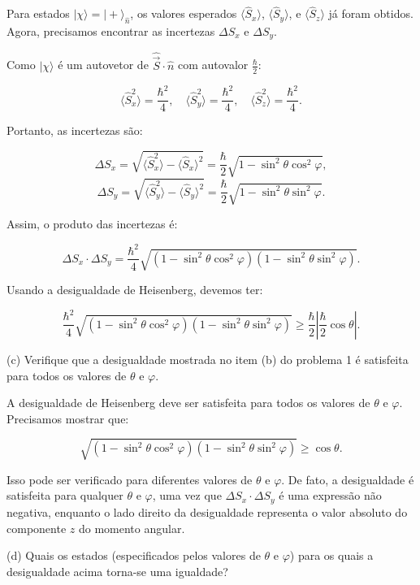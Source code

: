 \documentclass[12pt]{article}
\begin{document}
\begin{enumerate}
Para estados \(|\chi\rangle = |+\rangle_{\hat{n}}\), os valores esperados \(\langle \hat{S}_x \rangle\), \(\langle \hat{S}_y \rangle\), e \(\langle \hat{S}_z \rangle\) já foram obtidos. Agora, precisamos encontrar as incertezas \( \Delta S_x \) e \( \Delta S_y \).

Como \(|\chi\rangle\) é um autovetor de \(\hat{\vec{S}} \cdot \hat{n}\) com autovalor \(\frac{\hbar}{2}\):

\[
\langle \hat{S}_x^2 \rangle = \frac{\hbar^2}{4}, \quad \langle \hat{S}_y^2 \rangle = \frac{\hbar^2}{4}, \quad \langle \hat{S}_z^2 \rangle = \frac{\hbar^2}{4}.
\]

Portanto, as incertezas são:

\[
\Delta S_x = \sqrt{\langle \hat{S}_x^2 \rangle - \langle \hat{S}_x \rangle^2} = \frac{\hbar}{2} \sqrt{1 - \sin^2\theta \cos^2\varphi},
\]
\[
\Delta S_y = \sqrt{\langle \hat{S}_y^2 \rangle - \langle \hat{S}_y \rangle^2} = \frac{\hbar}{2} \sqrt{1 - \sin^2\theta \sin^2\varphi}.
\]

Assim, o produto das incertezas é:

\[
\Delta S_x \cdot \Delta S_y = \frac{\hbar^2}{4} \sqrt{(1 - \sin^2\theta \cos^2\varphi)(1 - \sin^2\theta \sin^2\varphi)}.
\]

Usando a desigualdade de Heisenberg, devemos ter:

\[
\frac{\hbar^2}{4} \sqrt{(1 - \sin^2\theta \cos^2\varphi)(1 - \sin^2\theta \sin^2\varphi)} \geq \frac{\hbar}{2} \left|\frac{\hbar}{2} \cos\theta \right|.
\]

(c) Verifique que a desigualdade mostrada no item (b) do problema 1 é satisfeita para todos os valores de $\theta$ e $\varphi$.

A desigualdade de Heisenberg deve ser satisfeita para todos os valores de \(\theta\) e \(\varphi\). Precisamos mostrar que:

\[
\sqrt{(1 - \sin^2\theta \cos^2\varphi)(1 - \sin^2\theta \sin^2\varphi)} \geq \cos\theta.
\]

Isso pode ser verificado para diferentes valores de \(\theta\) e \(\varphi\). De fato, a desigualdade é satisfeita para qualquer \(\theta\) e \(\varphi\), uma vez que \(\Delta S_x \cdot \Delta S_y\) é uma expressão não negativa, enquanto o lado direito da desigualdade representa o valor absoluto do componente \(z\) do momento angular.

(d) Quais os estados (especificados pelos valores de $\theta$ e $\varphi$) para os quais a desigualdade acima torna-se uma igualdade?


\end{enumerate}
\end{document}
